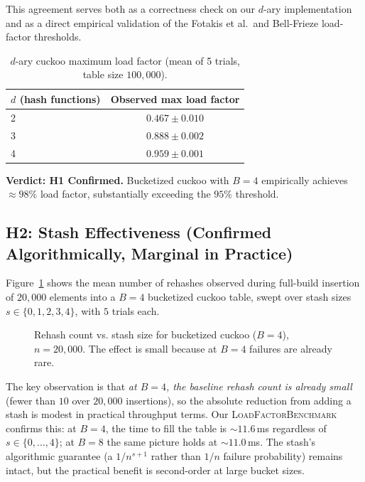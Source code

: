 \documentclass[10pt,journal,compsoc]{IEEEtran}
\begin{document}
This agreement serves both as a correctness check on our $d$-ary implementation and as a direct empirical validation of the Fotakis et al.\ and Bell-Frieze load-factor thresholds.

\begin{table}[h]
\centering
\caption{$d$-ary cuckoo maximum load factor (mean of 5 trials, table size $100{,}000$).}
\label{tab:dary}
\begin{tabular}{@{}lc@{}}
\toprule
$d$ (hash functions) & Observed max load factor \\
\midrule
2 & $0.467 \pm 0.010$ \\
3 & $0.888 \pm 0.002$ \\
4 & $0.959 \pm 0.001$ \\
\bottomrule
\end{tabular}
\end{table}

\textbf{Verdict: H1 Confirmed.} Bucketized cuckoo with $B=4$ empirically achieves $\approx 98\%$ load factor, substantially exceeding the $95\%$ threshold.

\subsection{H2: Stash Effectiveness (Confirmed Algorithmically, Marginal in Practice)}

Figure~\ref{fig:h2} shows the mean number of rehashes observed during full-build insertion of $20{,}000$ elements into a $B=4$ bucketized cuckoo table, swept over stash sizes $s\in\{0,1,2,3,4\}$, with $5$ trials each.

\begin{figure}[t]
\centering
{}
\caption{Rehash count vs. stash size for bucketized cuckoo ($B=4$), $n=20{,}000$. The effect is small because at $B=4$ failures are already rare.}
\label{fig:h2}
\end{figure}

The key observation is that \emph{at $B=4$, the baseline rehash count is already small} (fewer than $10$ over $20{,}000$ insertions), so the absolute reduction from adding a stash is modest in practical throughput terms. Our \textsc{LoadFactorBenchmark} confirms this: at $B=4$, the time to fill the table is $\sim 11.6$\,ms regardless of $s\in\{0,\ldots,4\}$; at $B=8$ the same picture holds at $\sim 11.0$\,ms. The stash's algorithmic guarantee (a $1/n^{s+1}$ rather than $1/n$ failure probability) remains intact, but the practical benefit is second-order at large bucket sizes.
\end{document}
